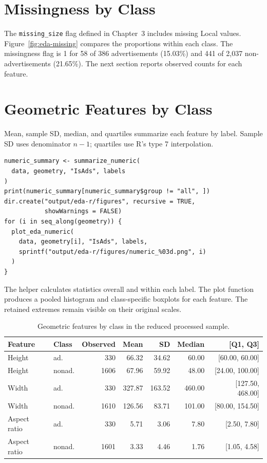 \section{Missingness by Class}
The \texttt{missing\_size} flag defined in Chapter~3 includes missing
Local values. Figure~\ref{fig:eda-missing} compares the proportions
within each class.
The missingness flag is 1 for 58 of 386 advertisements (15.03\%)
and 441 of 2,037 non-advertisements (21.65\%).
The next section reports observed counts for each feature.


\section{Geometric Features by Class}

Mean, sample SD, median, and quartiles summarize each feature by label.
Sample SD uses denominator \(n-1\); quartiles use R's type 7 interpolation.
\begin{lstlisting}[style=edaR]
numeric_summary <- summarize_numeric(
  data, geometry, "IsAds", labels
)
print(numeric_summary[numeric_summary$group != "all", ])
dir.create("output/eda-r/figures", recursive = TRUE,
           showWarnings = FALSE)
for (i in seq_along(geometry)) {
  plot_eda_numeric(
    data, geometry[i], "IsAds", labels,
    sprintf("output/eda-r/figures/numeric_%03d.png", i)
  )
}
\end{lstlisting}

The helper calculates statistics overall and within each label. The plot
function produces a pooled histogram and class-specific boxplots for each
feature. The retained extremes remain visible on their original scales.

\begin{table}[htbp]
\centering
\small
\caption{Geometric features by class in the reduced processed sample.}
\label{tab:eda-geometry}
\begin{tabular}{llrrrrr}
\toprule
Feature & Class & Observed & Mean & SD & Median & [Q1, Q3]\\
\midrule
Height & ad. & 330 & 66.32 & 34.62 & 60.00 & [60.00, 60.00]\\
Height & nonad. & 1606 & 67.96 & 59.92 & 48.00 & [24.00, 100.00]\\
Width & ad. & 330 & 327.87 & 163.52 & 460.00 & [127.50, 468.00]\\
Width & nonad. & 1610 & 126.56 & 83.71 & 101.00 & [80.00, 154.50]\\
Aspect ratio & ad. & 330 & 5.71 & 3.06 & 7.80 & [2.50, 7.80]\\
Aspect ratio & nonad. & 1601 & 3.33 & 4.46 & 1.76 & [1.05, 4.58]\\
\bottomrule
\end{tabular}
\end{table}

